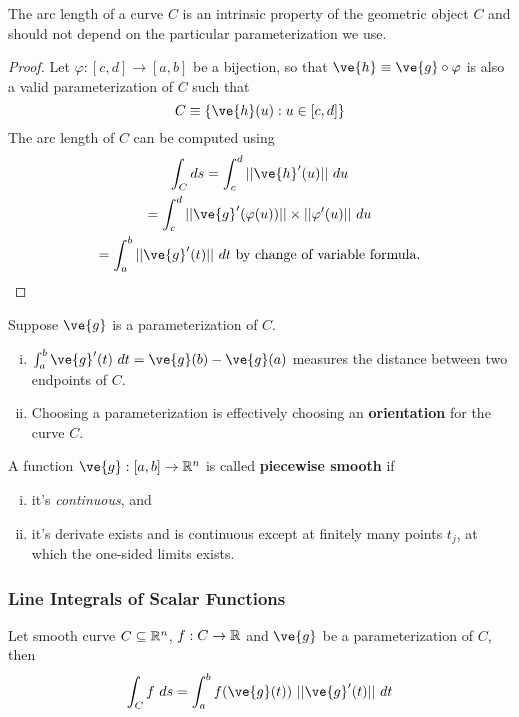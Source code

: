 \documentclass[11pt]{article}
\begin{document}
			\begin{proposition}
				The arc length of a curve $C$ is an intrinsic property of the geometric object $C$ and should not depend on the particular parameterization we use.
				\begin{proof}
					Let $\varphi:[c,d] \to [a,b]$ be a bijection, so that $\ve{h} \equiv \ve{g} \circ \varphi$ is also a valid parameterization of $C$ such that
					\begin{equation}
						C \equiv \{\ve{h}(u): u \in [c, d]\}
					\end{equation}
					The arc length of $C$ can be computed using
					\begin{gather}
						\int_C ds = \int_c^d ||\ve{h}'(u)||\ du \\
						= \int_c^d ||\ve{g}'(\varphi(u))|| \times ||\varphi'(u)||\ du \\
						= \int_a^b ||\ve{g}'(t)||\ dt \tx{ by change of variable formula.}
					\end{gather}
				\end{proof}
			\end{proposition}
			
			\begin{remark}[Interpretations]Suppose $\ve{g}$ is a parameterization of $C$.
				\begin{enumerate}[(i)]
					\item $\int_a^b \ve{g}'(t)\ dt = \ve{g}(b) - \ve{g}(a)$ measures the distance between two endpoints of $C$. 
					\item Choosing a parameterization is effectively choosing an \textbf{orientation} for the curve $C$.
				\end{enumerate}
			\end{remark}
			
			\begin{definition}
				A function $\ve{g}: [a, b] \to \R^n$ is called \textbf{piecewise smooth} if 
				\begin{enumerate}[(i)]
					\item it's \emph{continuous}, and 
					\item it's derivate exists and is continuous except at finitely many points $t_j$, at which the one-sided limits exists.
				\end{enumerate}
			\end{definition}
		
		\subsubsection{Line Integrals of Scalar Functions}
			\begin{definition} Let smooth curve $C \subseteq \mathbb{R}^n$, $f: C \to \mathbb{R}$ and $\ve{g}$ be a parameterization of $C$, then 
				\begin{equation}
					\int_C f\ ds = \int_a^b f(\ve{g}(t))\ ||\ve{g}'(t)||\ dt
				\end{equation}
			\end{definition}
			
\end{document}
